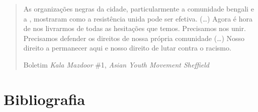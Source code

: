 \begin{quote}
As organizações negras da cidade, particularmente a comunidade bengali e a , mostraram como a resistência unida pode ser efetiva. (\ldots{}) Agora é hora de nos livrarmos de todas as hesitações que temos. Precisamos nos unir. Precisamos defender os direitos de nossa própria comunidade (\ldots{}) Nosso direito a permanecer aqui e nosso direito de lutar contra o racismo.

Boletim \emph{Kala Mazdoor} \#1, \emph{Asian Youth Movement Sheffield}
\end{quote}


\section{Bibliografia}


